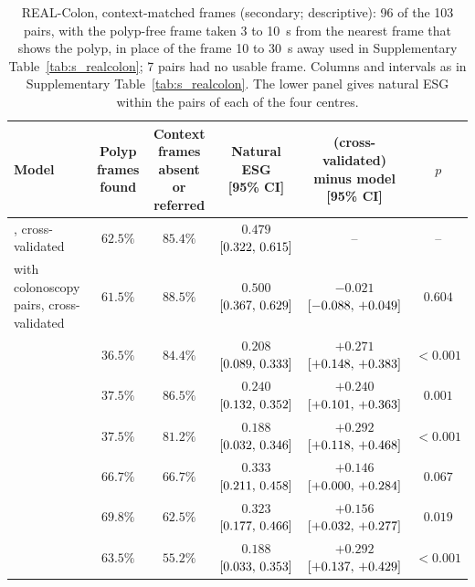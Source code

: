 \begin{table}[!htbp]
\caption{REAL-Colon, context-matched frames (secondary; descriptive): 96 of the 103 pairs, with the polyp-free frame taken 3 to 10~s from the nearest frame that shows the polyp, in place of the frame 10 to 30~s away used in Supplementary Table~\ref{tab:s_realcolon}; 7 pairs had no usable frame. Columns and intervals as in Supplementary Table~\ref{tab:s_realcolon}. The lower panel gives natural ESG within the pairs of each of the four centres.}
\label{tab:s_context}
\centering
\footnotesize
\begin{adjustbox}{max width=\linewidth}
\begin{tabular}{l cc c cc}
\toprule
Model & \shortstack{Polyp frames\\found} & \shortstack{Context frames\\absent or referred} & \shortstack{Natural ESG\\{}[95\% CI]} & \shortstack{\msn{} (cross-validated)\\minus model [95\% CI]} & $p$ \\
\midrule
\msn{}, cross-validated & $62.5\%$ & $85.4\%$ & $0.479$ $[0.322,\,0.615]$ & -- & -- \\
\msp{} with colonoscopy pairs, cross-validated & $61.5\%$ & $88.5\%$ & $0.500$ $[0.367,\,0.629]$ & $-0.021$ $[-0.088,\,+0.049]$ & $0.604$ \\
\ms{} & $36.5\%$ & $84.4\%$ & $0.208$ $[0.089,\,0.333]$ & $+0.271$ $[+0.148,\,+0.383]$ & $<0.001$ \\
\msp{} & $37.5\%$ & $86.5\%$ & $0.240$ $[0.132,\,0.352]$ & $+0.240$ $[+0.101,\,+0.363]$ & $0.001$ \\
\base{} & $37.5\%$ & $81.2\%$ & $0.188$ $[0.032,\,0.346]$ & $+0.292$ $[+0.118,\,+0.468]$ & $<0.001$ \\
\gem{} & $66.7\%$ & $66.7\%$ & $0.333$ $[0.211,\,0.458]$ & $+0.146$ $[+0.000,\,+0.284]$ & $0.067$ \\
\opus{} & $69.8\%$ & $62.5\%$ & $0.323$ $[0.177,\,0.466]$ & $+0.156$ $[+0.032,\,+0.277]$ & $0.019$ \\
\gpt{} & $63.5\%$ & $55.2\%$ & $0.188$ $[0.033,\,0.353]$ & $+0.292$ $[+0.137,\,+0.429]$ & $<0.001$ \\
\bottomrule
\end{tabular}
\end{adjustbox}


\end{table}
